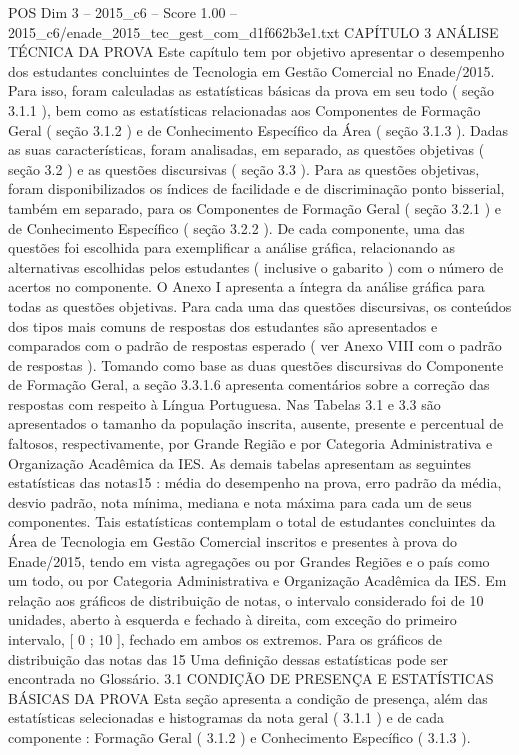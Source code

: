 \begin{textsample}{POS Dim 3 – 2015\_c6 – Score 1.00 – 2015\_c6/enade\_2015\_tec\_gest\_com\_d1f662b3e1.txt}  \label{ex:f3_pos_216}
CAPÍTULO 3 ANÁLISE TÉCNICA DA PROVA Este capítulo tem por objetivo apresentar o desempenho dos estudantes concluintes de Tecnologia em Gestão Comercial no Enade/2015.
Para isso, foram calculadas as estatísticas básicas da prova em seu todo ( seção 3.1.1 ), bem como as estatísticas relacionadas aos Componentes de Formação Geral ( seção 3.1.2 ) e de Conhecimento Específico da Área ( seção 3.1.3 ).
Dadas as suas características, foram analisadas, em separado, as questões objetivas ( seção 3.2 ) e as questões discursivas ( seção 3.3 ).
Para as questões objetivas, foram disponibilizados os índices de facilidade e de discriminação ponto bisserial, também em separado, para os Componentes de Formação Geral ( seção 3.2.1 ) e de Conhecimento Específico ( seção 3.2.2 ).
De cada componente, uma das questões foi escolhida para exemplificar a análise gráfica, relacionando as alternativas escolhidas pelos estudantes ( inclusive o gabarito ) com o número de acertos no componente.
O Anexo I apresenta a íntegra da análise gráfica para todas as questões objetivas.
Para cada uma das questões discursivas, os conteúdos dos tipos mais comuns de respostas dos estudantes são apresentados e comparados com o padrão de respostas esperado ( ver Anexo VIII com o padrão de respostas ).
Tomando como base as duas questões discursivas do Componente de Formação Geral, a seção 3.3.1.6 apresenta comentários sobre a correção das respostas com respeito à Língua Portuguesa.
Nas Tabelas 3.1 e 3.3 são apresentados o tamanho da população inscrita, ausente, presente e percentual de faltosos, respectivamente, por Grande Região e por Categoria Administrativa e Organização Acadêmica da IES.
As demais tabelas apresentam as seguintes estatísticas das notas15 : média do desempenho na prova, erro padrão da média, desvio padrão, nota mínima, mediana e nota máxima para cada um de seus componentes.
Tais estatísticas contemplam o total de estudantes concluintes da Área de Tecnologia em Gestão Comercial inscritos e presentes à prova do Enade/2015, tendo em vista agregações ou por Grandes Regiões e o país como um todo, ou por Categoria Administrativa e Organização Acadêmica da IES.
Em relação aos gráficos de distribuição de notas, o intervalo considerado foi de 10 unidades, aberto à esquerda e fechado à direita, com exceção do primeiro intervalo, [ 0 ; 10 ], fechado em ambos os extremos.
Para os gráficos de distribuição das notas das 15 Uma definição dessas estatísticas pode ser encontrada no Glossário. 3.1 CONDIÇÃO DE PRESENÇA E ESTATÍSTICAS BÁSICAS DA PROVA Esta seção apresenta a condição de presença, além das estatísticas selecionadas e histogramas da nota geral ( 3.1.1 ) e de cada componente : Formação Geral ( 3.1.2 ) e Conhecimento Específico ( 3.1.3 ).

\end{textsample}

